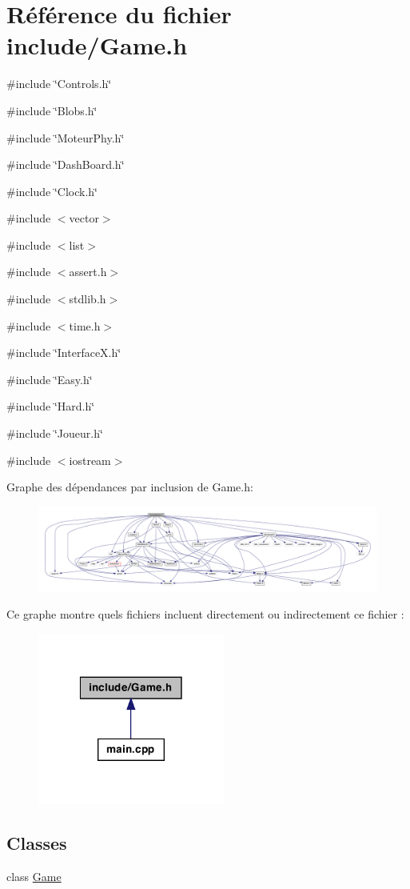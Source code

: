 \hypertarget{a00025}{
\section{Référence du fichier include/Game.h}
\label{a00025}
}
{\ttfamily \#include \char`\"{}Controls.h\char`\"{}}\par
{\ttfamily \#include \char`\"{}Blobs.h\char`\"{}}\par
{\ttfamily \#include \char`\"{}MoteurPhy.h\char`\"{}}\par
{\ttfamily \#include \char`\"{}DashBoard.h\char`\"{}}\par
{\ttfamily \#include \char`\"{}Clock.h\char`\"{}}\par
{\ttfamily \#include $<$vector$>$}\par
{\ttfamily \#include $<$list$>$}\par
{\ttfamily \#include $<$assert.h$>$}\par
{\ttfamily \#include $<$stdlib.h$>$}\par
{\ttfamily \#include $<$time.h$>$}\par
{\ttfamily \#include \char`\"{}InterfaceX.h\char`\"{}}\par
{\ttfamily \#include \char`\"{}Easy.h\char`\"{}}\par
{\ttfamily \#include \char`\"{}Hard.h\char`\"{}}\par
{\ttfamily \#include \char`\"{}Joueur.h\char`\"{}}\par
{\ttfamily \#include $<$iostream$>$}\par
Graphe des dépendances par inclusion de Game.h:
\nopagebreak
\begin{figure}[H]
\begin{center}
\leavevmode
\includegraphics[width=400pt]{a00052}
\end{center}
\end{figure}
Ce graphe montre quels fichiers incluent directement ou indirectement ce fichier :
\nopagebreak
\begin{figure}[H]
\begin{center}
\leavevmode
\includegraphics[width=174pt]{a00053}
\end{center}
\end{figure}
\subsection*{Classes}
\begin{DoxyCompactItemize}
\item 
class \hyperlink{a00008}{Game}
\end{DoxyCompactItemize}
